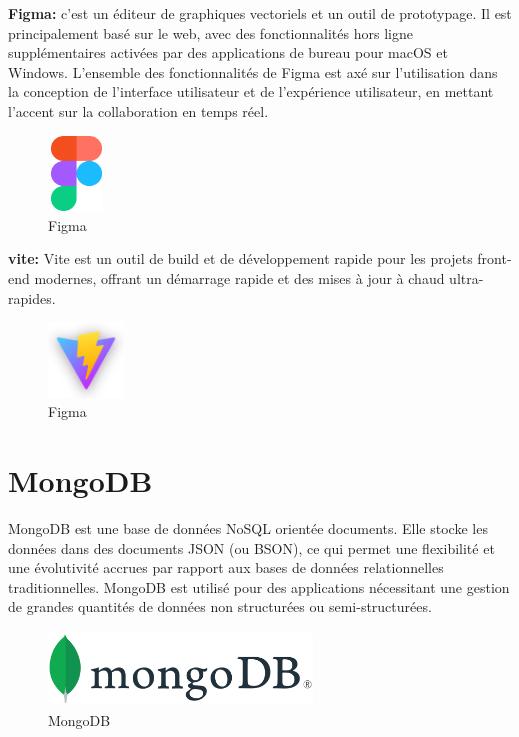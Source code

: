 \documentclass[edit,12pt,a4paper,ChapStyle,oneside,doubleinterligne]{report}
\begin{document}
\textbf{Figma: }c'est un éditeur de graphiques vectoriels et un outil de prototypage. Il est principalement basé sur le web, avec des fonctionnalités hors ligne supplémentaires activées par des applications de bureau pour macOS et Windows. L'ensemble des fonctionnalités de Figma est axé sur l'utilisation dans la conception de l'interface utilisateur et de l'expérience utilisateur, en mettant l'accent sur la collaboration en temps réel\cite{figma}.
  \begin{figure}[H] 
    \centering
    \includegraphics[width=1.5cm , height = 2cm , angle=360]{images/figma.png}
    \caption{Figma}
    \label{fig:figma}
\end{figure}
\textbf{vite: }Vite est un outil de build et de développement rapide pour les projets front-end modernes, offrant un démarrage rapide et des mises à jour à chaud ultra-rapides.
\begin{figure}[H] 
    \centering
    \includegraphics[width=2cm , height = 2cm , angle=360]{images/logo-with-shadow.png}
    \caption{Figma}
    \label{fig:figma}
\end{figure}
\section{MongoDB} MongoDB est une base de données NoSQL orientée documents. Elle stocke les données dans des documents JSON (ou BSON), ce qui permet une flexibilité et une évolutivité accrues par rapport aux bases de données relationnelles traditionnelles. MongoDB est utilisé pour des applications nécessitant une gestion de grandes quantités de données non structurées ou semi-structurées.
\begin{figure}[H] 
    \centering
    \includegraphics[width=7cm , height = 2cm , angle=360]{images/mongodb.png}
    \caption{MongoDB}
    \label{fig:MongoDB}
\end{figure}
\end{document}

